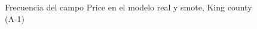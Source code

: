 \begin{figure}[H]
    \centering
    
    \caption{Frecuencia del campo Price en el modelo real y smote, King county (A-1)}
    \label{frecuency-smote-price}
\end{figure}